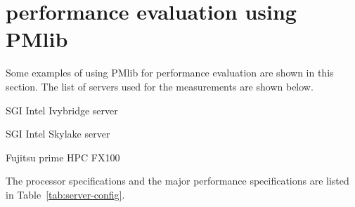 \documentclass[conference]{IEEEtran}
\begin{document}
\section{performance evaluation using PMlib}
\label{section:using-PMlib}

Some examples of using PMlib for performance evaluation are shown in this
section.
The list of servers used for the measurements are shown below.
\begin{itemize}
{
\item SGI Intel Ivybridge server
\item SGI Intel Skylake server
\item Fujitsu prime HPC FX100
}
\end{itemize}
The processor specifications and the major performance specifications
are listed in Table~\ref{tab:server-config}.
\end{document}
